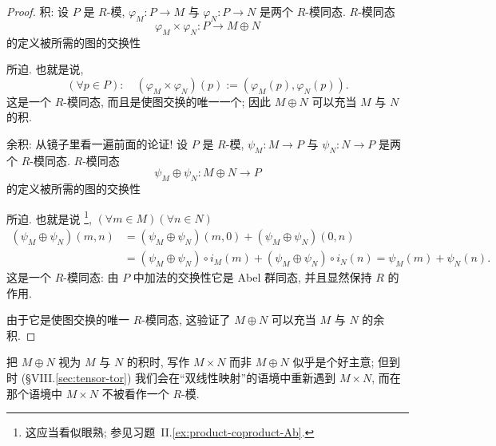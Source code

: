 \begin{proof}
积: 设 $P$ 是 $R$-模, $\varphi_M : P \to M$ 与 $\varphi_N : P \to N$ 是两个 $R$-模同态. $R$-模同态
\[
\varphi_M \times \varphi_N : P \to M \oplus N
\]
的定义被所需的图的交换性
\begin{center}
\end{center}
所迫. 也就是说,
\[
(\forall p \in P): \quad (\varphi_M \times \varphi_N)(p) := (\varphi_M(p), \varphi_N(p)).
\]
这是一个 $R$-模同态, 而且是使图交换的唯一一个; 因此 $M \oplus N$ 可以充当 $M$ 与 $N$ 的积.

余积: 从镜子里看一遍前面的论证! 设 $P$ 是 $R$-模, $\psi_M : M \to P$ 与 $\psi_N : N \to P$ 是两个 $R$-模同态. $R$-模同态
\[
\psi_M \oplus \psi_N : M \oplus N \to P
\]
的定义被所需的图的交换性
\begin{center}
\end{center}
所迫. 也就是说%
\footnote{这应当看似眼熟; 参见习题~II.\ref{ex:product-coproduct-Ab}.}, $(\forall m \in M)(\forall n \in N)$
\begin{align*}
(\psi_M \oplus \psi_N)(m, n) &= (\psi_M \oplus \psi_N)(m, 0) + (\psi_M \oplus \psi_N)(0, n) \\
&= (\psi_M \oplus \psi_N) \circ i_M(m) + (\psi_M \oplus \psi_N) \circ i_N(n) = \psi_M(m) + \psi_N(n).
\end{align*}
这是一个 $R$-模同态: 由 $P$ 中加法的交换性它是 Abel 群同态, 并且显然保持 $R$ 的作用.

由于它是使图交换的唯一 $R$-模同态, 这验证了 $M \oplus N$ 可以充当 $M$ 与 $N$ 的余积.
\end{proof}

把 $M \oplus N$ 视为 $M$ 与 $N$ 的积时, 写作 $M \times N$ 而非 $M \oplus N$ 似乎是个好主意; 但到时 (\S VIII.\ref{sec:tensor-tor}) 我们会在``双线性映射''的语境中重新遇到 $M \times N$, 而在那个语境中 $M \times N$ 不被看作一个 $R$-模.

